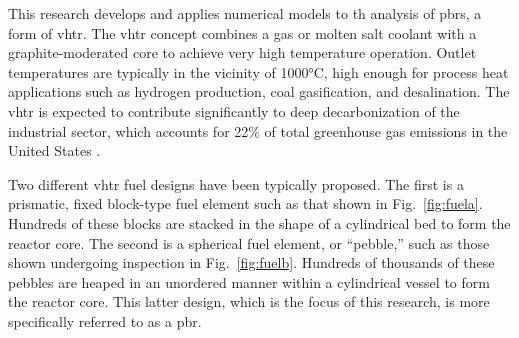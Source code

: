 This research develops and applies numerical models to \gls{th} analysis of \glspl{pbr}, a form of \gls{vhtr}. The \gls{vhtr} concept combines a gas or molten salt coolant with a graphite-moderated core to achieve very high temperature operation. Outlet temperatures are typically in the vicinity of 1000\si{\celsius}, high enough for process heat applications such as hydrogen production, coal gasification, and desalination. The \gls{vhtr} is expected to contribute significantly to deep decarbonization of the industrial sector, which accounts for 22\% of total greenhouse gas emissions in the United States \cite{epa}. 

Two different \gls{vhtr} fuel designs have been typically proposed. The first is a prismatic, fixed block-type fuel element such as that shown in Fig.\ \ref{fig:fuela}. Hundreds of these blocks are stacked in the shape of a cylindrical bed to form the reactor core. The second is a spherical fuel element, or ``pebble,'' such as those shown undergoing inspection in Fig.\ \ref{fig:fuelb}. Hundreds of thousands of these pebbles are heaped in an unordered manner within a cylindrical vessel to form the reactor core. This latter design, which is the focus of this research, is more specifically referred to as a \gls{pbr}.

